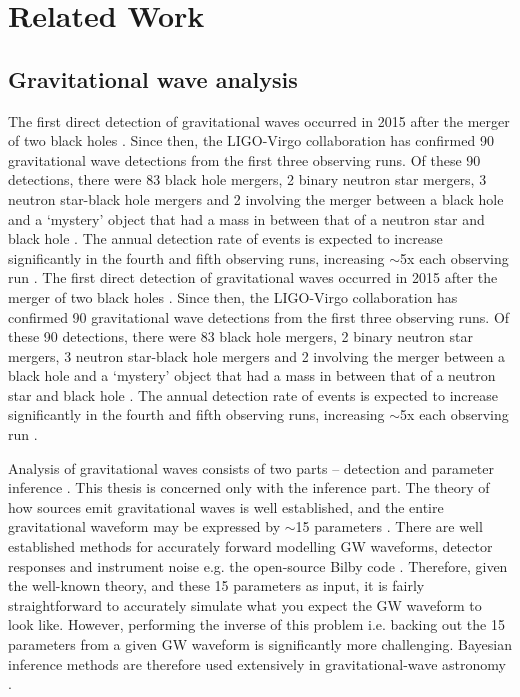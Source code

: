 \section{Related Work}
\label{sec:related_work}

\subsection{Gravitational wave analysis}

The first direct detection of gravitational waves occurred in 2015 after the merger of two black holes \cite{LIGO_2016}. Since then, the LIGO-Virgo collaboration has confirmed 90 gravitational wave detections from the first three observing runs. Of these 90 detections, there were 83 black hole mergers, 2 binary neutron star mergers, 3 neutron star-black hole mergers and 2 involving the merger between a black hole and a `mystery' object that had a mass in between that of a neutron star and black hole \cite{LIGO_FAQ_Website}. The annual detection rate of events is expected to increase significantly in the fourth and fifth observing runs, increasing $\sim$5x each observing run \cite{Petrov_2022}.
The first direct detection of gravitational waves occurred in 2015 after the merger of two black holes \cite{LIGO_2016}. Since then, the LIGO-Virgo collaboration has confirmed 90 gravitational wave detections from the first three observing runs. Of these 90 detections, there were 83 black hole mergers, 2 binary neutron star mergers, 3 neutron star-black hole mergers and 2 involving the merger between a black hole and a `mystery' object that had a mass in between that of a neutron star and black hole \cite{LIGO_FAQ_Website}. The annual detection rate of events is expected to increase significantly in the fourth and fifth observing runs, increasing $\sim$5x each observing run \cite{Petrov_2022}.

Analysis of gravitational waves consists of two parts -- detection and parameter inference \cite{bhardwaj2023peregrine}. This thesis is concerned only with the inference part. The theory of how sources emit gravitational waves is well established, and the entire gravitational waveform may be expressed by $\sim$15 parameters \cite{Thrane_Talbot_2019}. There are well established methods for accurately forward modelling GW waveforms, detector responses and instrument noise \cite{alvey2023things} e.g. the open-source Bilby code \cite{Ashton_Bilby_2019,Romero_Bilby_2020,Ashton_Talbot_Bilby_2021}. Therefore, given the well-known theory, and these 15 parameters as input, it is fairly straightforward to accurately simulate what you expect the GW waveform to look like. However, performing the inverse of this problem i.e. backing out the 15 parameters from a given GW waveform is significantly more challenging. Bayesian inference methods are therefore used extensively in gravitational-wave astronomy \cite{Thrane_Talbot_2019}.

